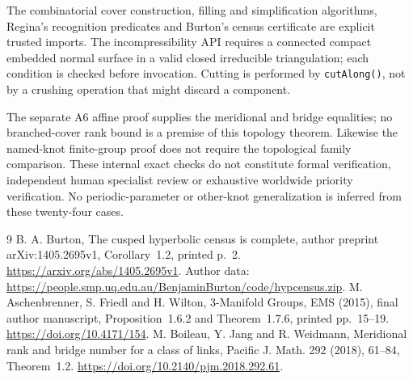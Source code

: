 \documentclass[11pt]{article}
\begin{document}
The combinatorial cover construction, filling and simplification
algorithms, Regina's recognition predicates and Burton's census
certificate are explicit trusted imports.
The incompressibility API requires a connected compact embedded
normal surface in a valid closed irreducible triangulation;
each condition is checked before invocation.
Cutting is performed by \texttt{cutAlong()}, not by a crushing
operation that might discard a component.

The separate A6 affine proof supplies the meridional and bridge
equalities; no branched-cover rank bound is a premise of this
topology theorem. Likewise the named-knot finite-group proof does not
require the topological family comparison.
These internal exact checks do not constitute formal verification,
independent human specialist review or exhaustive worldwide priority
verification. No periodic-parameter or other-knot generalization is
inferred from these twenty-four cases.

\begin{thebibliography}{9}
B. A. Burton, The cusped hyperbolic census is complete,
author preprint arXiv:1405.2695v1, Corollary~1.2, printed p.~2.
\url{https://arxiv.org/abs/1405.2695v1}.
Author data:
\url{https://people.smp.uq.edu.au/BenjaminBurton/code/hypcensus.zip}.
M. Aschenbrenner, S. Friedl and H. Wilton,
3-Manifold Groups, EMS (2015), final author manuscript,
Proposition~1.6.2 and Theorem~1.7.6, printed pp.~15--19.
\url{https://doi.org/10.4171/154}.
M. Boileau, Y. Jang and R. Weidmann,
Meridional rank and bridge number for a class of links,
Pacific J. Math. 292 (2018), 61--84, Theorem~1.2.
\url{https://doi.org/10.2140/pjm.2018.292.61}.
\end{thebibliography}
\end{document}
